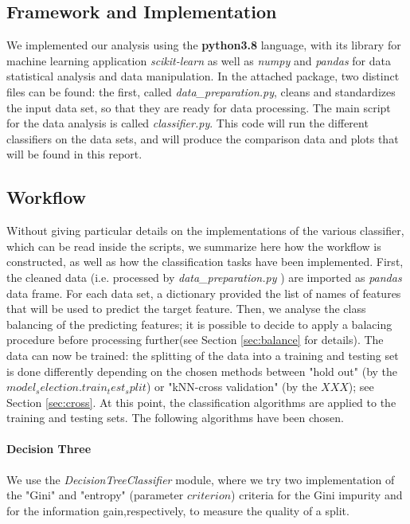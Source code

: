 \documentclass{article}
\begin{document}
\subsection{Framework and Implementation}
We implemented our analysis using the \textbf{python3.8} language, with its library for machine learning application \textit{scikit-learn} as well as \textit{numpy} and \textit{pandas} for data statistical analysis and data manipulation. In the attached package, two distinct files can be found: the first, called \textit{data\_preparation.py}, cleans and standardizes the input data set, so that they are ready for data processing. The main script for the data analysis is called \textit{classifier.py}. This code will run the different classifiers on the data sets, and will produce the comparison data and plots that will be found in this report.



\subsection{Workflow}
Without giving particular details on the implementations of the various classifier, which can be read inside the scripts, we summarize here how the workflow is constructed, as well as how the classification tasks have been implemented.
First, the cleaned data (i.e. processed by \textit{data\_preparation.py} ) are imported as \textit{pandas} data frame. For each data set, a dictionary provided the list of names of features that will be used to predict the target feature. Then, we analyse the class balancing of the predicting features; it is possible to decide to apply a balacing procedure before processing further(see Section \ref{sec:balance} for details). The data can now be trained: the splitting of the data into a training and testing set is done differently depending on the chosen methods between "hold out" (by the $model_selection.train_test_split$)  or "kNN-cross validation" (by the $ XXX$); see Section \ref{sec:cross}.
At this point, the classification algorithms are applied to the training and testing sets. The following algorithms have been chosen.

\paragraph{Decision Three} We use the \textit{DecisionTreeClassifier} module, where we try two implementation of the "Gini" and "entropy" (parameter $criterion$) criteria for the Gini impurity and for the information gain,respectively, to measure the quality of a split.
\end{document}
